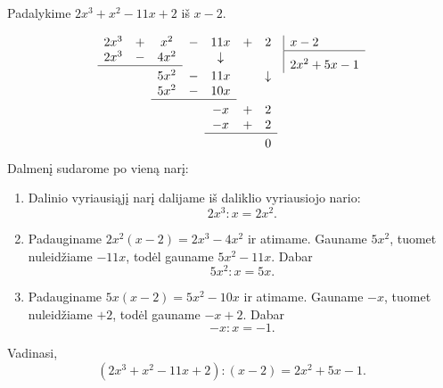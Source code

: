\documentclass[11pt,a4paper]{scrartcl}
\begin{document}
\begin{example}
Padalykime $2x^3+x^2-11x+2$ iš $x-2$.

\setlength{\arraycolsep}{2pt}
\renewcommand{\arraystretch}{1.1}
\[
\begin{array}[t]{ccccccc}
  2x^3 & + & x^2  & - & 11x & + & 2 \\
  2x^3 & - & 4x^2 &   & \downarrow & & \\
  \cline{1-3}
  \noalign{\vskip 3pt}
	  &   & 5x^2  & - & 11x &   & \downarrow \\
	  &   & 5x^2  & - & 10x &   & \\
  \cline{3-5}
  \noalign{\vskip 3pt}
	  &   &       &   & -x  & + & 2 \\
	  &   &       &   & -x  & + & 2 \\
  \cline{5-7}
  \noalign{\vskip 3pt}
	  &   &       &   &     &   & 0
\end{array}
\enskip
\begin{array}[t]{|@{\enskip}l}
  x-2 \\
  \hline
  \rule{0pt}{14pt}2x^2+5x-1
\end{array}
\]
Dalmenį sudarome po vieną narį:
\begin{enumerate}
	\item Dalinio vyriausiąjį narį dalijame iš daliklio vyriausiojo nario:
	\[
	2x^3:x=2x^2.
	\]
	\item Padauginame $2x^2(x-2)=2x^3-4x^2$ ir atimame. Gauname $5x^2$, tuomet nuleidžiame $-11x$, todėl gauname $5x^2-11x$. Dabar
	\[
	5x^2:x=5x.
	\]
	\item Padauginame $5x(x-2)=5x^2-10x$ ir atimame. Gauname $-x$, tuomet nuleidžiame $+2$, todėl gauname $-x+2$. Dabar
	\[
	-x:x=-1.
	\]
\end{enumerate}
Vadinasi,
\[
(2x^3+x^2-11x+2):(x-2)=2x^2+5x-1.
\]
\end{example}
\end{document}
